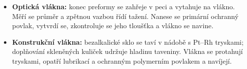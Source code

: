 \begin{itemize}
\item \textbf{Optická vlákna:} konec preformy se zahřeje v peci a vytahuje na vlákno. Měří se průměr a zpětnou vazbou řídí tažení. Nanese se primární ochranný povlak, vytvrdí se, zkontroluje se jeho tloušťka a vlákno se navine.
\item \textbf{Konstrukční vlákna:} bezalkalické sklo se taví v nádobě s Pt--Rh tryskami; doplňování skleněných kuliček udržuje hladinu taveniny. Vlákna se protahují tryskami, opatří lubrikací a ochranným polymerním povlakem a navíjejí.
\end{itemize}
